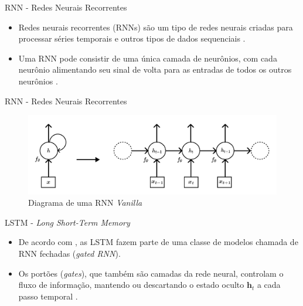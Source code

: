 \documentclass{beamer}
\newcommand{\bs}[1]{\boldsymbol{#1}}
\begin{document}
    \begin{frame}{RNN - Redes Neurais Recorrentes}
        \begin{itemize}
            \item Redes neurais recorrentes (RNNs) são um tipo de redes neurais criadas para processar séries temporais e outros tipos de dados sequenciais \citep{fan2021}.
            \item Uma RNN pode consistir de uma única camada de neurônios, com cada neurônio alimentando seu sinal de volta para as entradas de todos os outros neurônios \citep{haykin2009}.
        \end{itemize}
    \end{frame}
    
    \begin{frame}{RNN - Redes Neurais Recorrentes}
        \begin{figure}
            \centering
            \includegraphics[scale=0.35]{figuras/rnn_hidden_state.pdf}
	        \caption{Diagrama de uma RNN \textit{Vanilla} \citep[adaptado de][]{goodfellow2016, kamath2019}}
        \end{figure}
    \end{frame}
    
    \begin{frame}{LSTM - \textit{Long Short-Term Memory}}
        \begin{itemize}
            \justifying
            \item De acordo com \citet{goodfellow2016}, as LSTM fazem parte de uma classe de modelos chamada de RNN fechadas (\textit{gated RNN}).
            \item Os portões (\textit{gates}), que também são camadas da rede neural, controlam o fluxo de informação, mantendo ou descartando o estado oculto $\bs{h}_{t}$ a cada passo temporal \citep{kamath2019}.
        \end{itemize}  
    \end{frame}
    
\end{document}
